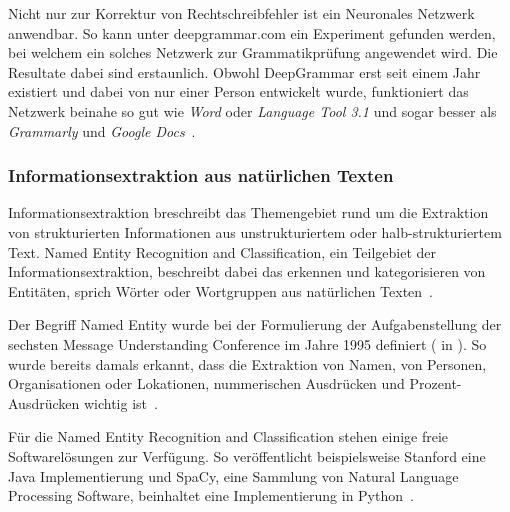 \documentclass{hwz}
\begin{document}
Nicht nur zur Korrektur von Rechtschreibfehler ist ein Neuronales Netzwerk anwendbar. So kann unter deepgrammar.com ein Experiment gefunden werden, bei welchem ein solches Netzwerk zur Grammatikprüfung angewendet wird. Die Resultate dabei sind erstaunlich. Obwohl DeepGrammar erst seit einem Jahr existiert und dabei von nur einer Person entwickelt wurde, funktioniert das Netzwerk beinahe so gut wie \textit{Word} oder \textit{Language Tool 3.1} und sogar besser als \textit{Grammarly} und \textit{Google Docs}~\autocite{MuganEvaluationComparison}.

\subsubsection{Informationsextraktion aus natürlichen Texten}



Informationsextraktion breschreibt das Themengebiet rund um die Extraktion von strukturierten Informationen aus unstrukturiertem oder halb-strukturiertem Text. Named Entity Recognition and Classification, ein Teilgebiet der Informationsextraktion, beschreibt dabei das erkennen und kategorisieren von Entitäten, sprich Wörter oder Wortgruppen aus natürlichen Texten~\autocite{Nadeau2007AClassification}.

Der Begriff Named Entity wurde bei der Formulierung der Aufgabenstellung der sechsten Message Understanding Conference im Jahre 1995 definiert (\cite{Borthwick1998NYU:MUC-7} in \cite{Nadeau2007AClassification}). So wurde bereits damals erkannt, dass die Extraktion von Namen, von Personen, Organisationen oder Lokationen, nummerischen Ausdrücken und Prozent-Ausdrücken wichtig ist~\autocite{Nadeau2007AClassification}.

Für die Named Entity Recognition and Classification stehen einige freie Softwarelösungen zur Verfügung. So veröffentlicht beispielsweise Stanford eine Java Implementierung und SpaCy, eine Sammlung von Natural Language Processing Software, beinhaltet eine Implementierung in Python~\autocite{StanfordNLPGroupStanfordNER, ExplosionAIIndustrial-StrengthProcessing}.
\end{document}
